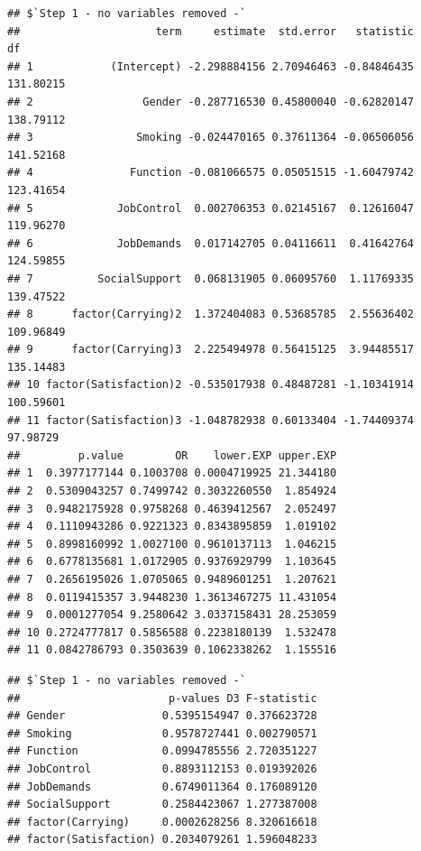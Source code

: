 \documentclass[
]{book}
\newenvironment{Shaded}{\begin{snugshade}}{\end{snugshade}}
\newcommand{\NormalTok}[1]{#1}
\newcommand{\SpecialCharTok}[1]{\textcolor[rgb]{0.00,0.00,0.00}{#1}}
\begin{document}
\begin{verbatim}
## $`Step 1 - no variables removed -`
##                     term     estimate  std.error   statistic        df
## 1            (Intercept) -2.298884156 2.70946463 -0.84846435 131.80215
## 2                 Gender -0.287716530 0.45800040 -0.62820147 138.79112
## 3                Smoking -0.024470165 0.37611364 -0.06506056 141.52168
## 4               Function -0.081066575 0.05051515 -1.60479742 123.41654
## 5             JobControl  0.002706353 0.02145167  0.12616047 119.96270
## 6             JobDemands  0.017142705 0.04116611  0.41642764 124.59855
## 7          SocialSupport  0.068131905 0.06095760  1.11769335 139.47522
## 8      factor(Carrying)2  1.372404083 0.53685785  2.55636402 109.96849
## 9      factor(Carrying)3  2.225494978 0.56415125  3.94485517 135.14483
## 10 factor(Satisfaction)2 -0.535017938 0.48487281 -1.10341914 100.59601
## 11 factor(Satisfaction)3 -1.048782938 0.60133404 -1.74409374  97.98729
##         p.value        OR    lower.EXP upper.EXP
## 1  0.3977177144 0.1003708 0.0004719925 21.344180
## 2  0.5309043257 0.7499742 0.3032260550  1.854924
## 3  0.9482175928 0.9758268 0.4639412567  2.052497
## 4  0.1110943286 0.9221323 0.8343895859  1.019102
## 5  0.8998160992 1.0027100 0.9610137113  1.046215
## 6  0.6778135681 1.0172905 0.9376929799  1.103645
## 7  0.2656195026 1.0705065 0.9489601251  1.207621
## 8  0.0119415357 3.9448230 1.3613467275 11.431054
## 9  0.0001277054 9.2580642 3.0337158431 28.253059
## 10 0.2724777817 0.5856588 0.2238180139  1.532478
## 11 0.0842786793 0.3503639 0.1062338262  1.155516
\end{verbatim}

\begin{Shaded}
\end{Shaded}

\begin{verbatim}
## $`Step 1 - no variables removed -`
##                       p-values D3 F-statistic
## Gender               0.5395154947 0.376623728
## Smoking              0.9578727441 0.002790571
## Function             0.0994785556 2.720351227
## JobControl           0.8893112153 0.019392026
## JobDemands           0.6749011364 0.176089120
## SocialSupport        0.2584423067 1.277387008
## factor(Carrying)     0.0002628256 8.320616618
## factor(Satisfaction) 0.2034079261 1.596048233
\end{verbatim}
\end{document}
